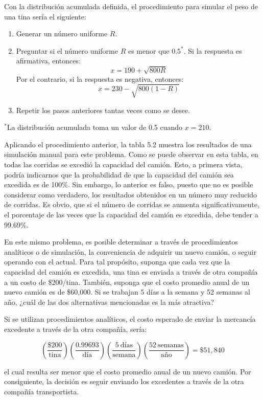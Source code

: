\documentclass[11pt,letterpaper]{report}
\begin{document}
Con la distribución acumulada definida, el procedimiento para simular el
peso de una tina sería el siguiente:

\begin{enumerate}[label=\arabic*.]
\item Generar un número uniforme $R$.
\item Preguntar si el número uniforme $R$ es menor que $0.5^{*}$. Si la
respuesta es afirmativa, entonces:
\[
x = 190 + \sqrt{800R}
\]
Por el contrario, si la respuesta es negativa, entonces:
\[
x = 230 - \sqrt{800(1-R)}
\]
\item Repetir los pasos anteriores tantas veces como se desee.
\end{enumerate}

{\footnotesize $^{*}$La distribución acumulada toma un valor de 0.5 cuando $x=210$.}

Aplicando el procedimiento anterior, la tabla 5.2 muestra los resultados
de una simulación manual para este problema. Como se puede observar en
esta tabla, en todas las corridas se excedió la capacidad del camión.
Esto, a primera vista, podría indicarnos que la probabilidad de que la
capacidad del camión sea excedida es de 100\%. Sin embargo, lo anterior es
falso, puesto que no es posible considerar como verdadero, los resultados
obtenidos en un número muy reducido de corridas. Es obvio, que si el
número de corridas se aumenta significativamente, el porcentaje de las
veces que la capacidad del camión es excedida, debe tender a 99.69\%.

En este mismo problema, es posible determinar a través de procedimientos
analíticos o de simulación, la conveniencia de adquirir un nuevo camión, o
seguir operando con el actual. Para tal propósito, suponga que cada vez que
la capacidad del camión es excedida, una tina es enviada a través de otra
compañía a un costo de \$200/tina. También, suponga que el costo promedio
anual de un nuevo camión es de \$60,000. Si se trabajan 5 días a la semana y
52 semanas al año, ¿cuál de las dos alternativas mencionadas es la más
atractiva?

Si se utilizan procedimientos analíticos, el costo esperado de enviar la
mercancía excedente a través de la otra compañía, sería:

\[
\left(\frac{\$200}{\text{tina}}\right)\left(\frac{0.99693}{\text{día}}\right)\left(\frac{5\ \text{días}}{\text{semana}}\right)\left(\frac{52\ \text{semanas}}{\text{año}}\right) = \$51{,}840
\]

el cual resulta ser menor que el costo promedio anual de un nuevo camión.
Por consiguiente, la decisión es seguir enviando los excedentes a través
de la otra compañía transportista.
\end{document}
